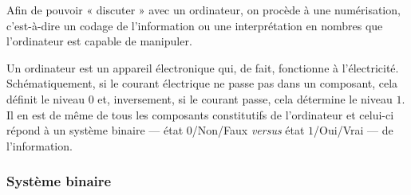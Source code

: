 
Afin de pouvoir « discuter » avec un ordinateur, on procède à une numérisation, c'est-à-dire un codage de l'information ou une interprétation en nombres que l'ordinateur est capable de manipuler. 
 
Un ordinateur est un appareil électronique qui, de fait, fonctionne à l'électricité. Schématiquement, si le courant électrique ne passe pas dans un composant, cela définit le niveau $0$ et, inversement, si le courant passe, cela détermine le niveau $1$. Il en est de même de tous les composants constitutifs de l'ordinateur et celui-ci répond à un système binaire --- état $0$/Non/Faux \textit{versus} état $1$/Oui/Vrai --- de l'information.


\subsubsection[Système binaire]{Système binaire}
\label{subsub:V.1.1.1}

